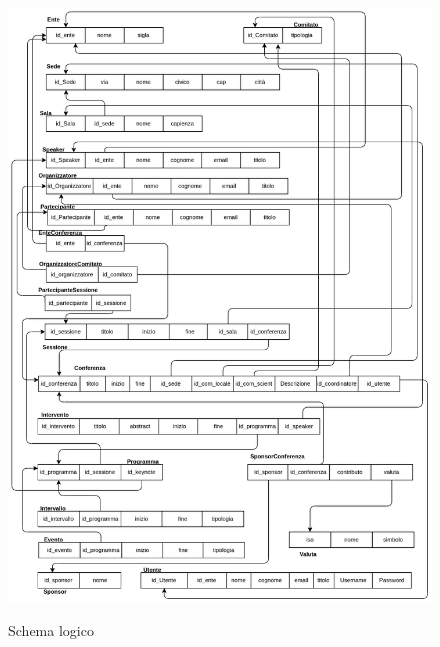 \begin{figure}
	\centering
	\caption{Schema logico}
	\includegraphics[scale=0.6]{Immagini/Schema_logico.png}\label{fig:schema_logico}
\end{figure}
